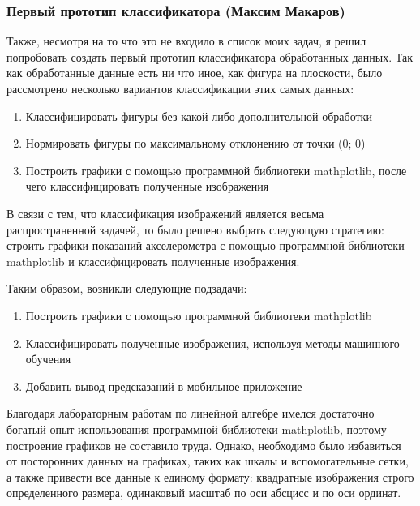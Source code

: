 
\subsubsection{Первый прототип классификатора (Максим Макаров)}
Также, несмотря на то что это не входило в список моих задач, я решил попробовать создать первый прототип классификатора обработанных данных.
Так как обработанные данные есть ни что иное, как фигура на плоскости, было рассмотрено несколько вариантов классификации этих самых данных:
\begin{enumerate}
    \item Классифицировать фигуры без какой-либо дополнительной обработки
    \item Нормировать фигуры по максимальному отклонению от точки (0; 0)
    \item Построить графики с помощью программной библиотеки mathplotlib, после чего классифицировать полученные изображения
\end{enumerate}
В связи с тем, что классификация изображений является весьма распространенной задачей, то было решено выбрать следующую стратегию: строить графики показаний акселерометра с помощью программной библиотеки mathplotlib и классифицировать полученные изображения.

Таким образом, возникли следующие подзадачи:
\begin{enumerate}
    \item Построить графики с помощью программной библиотеки mathplotlib
    \item Классифицировать полученные изображения, используя методы машинного обучения
    \item Добавить вывод предсказаний в мобильное приложение
\end{enumerate}
Благодаря лабораторным работам по линейной алгебре имелся достаточно богатый опыт использования программной библиотеки mathplotlib, поэтому построение графиков не составило труда. Однако, необходимо было избавиться от посторонних данных на графиках, таких как шкалы и вспомогательные сетки, а также привести все данные к единому формату: квадратные изображения строго определенного размера, одинаковый масштаб по оси абсцисс и по оси ординат.

